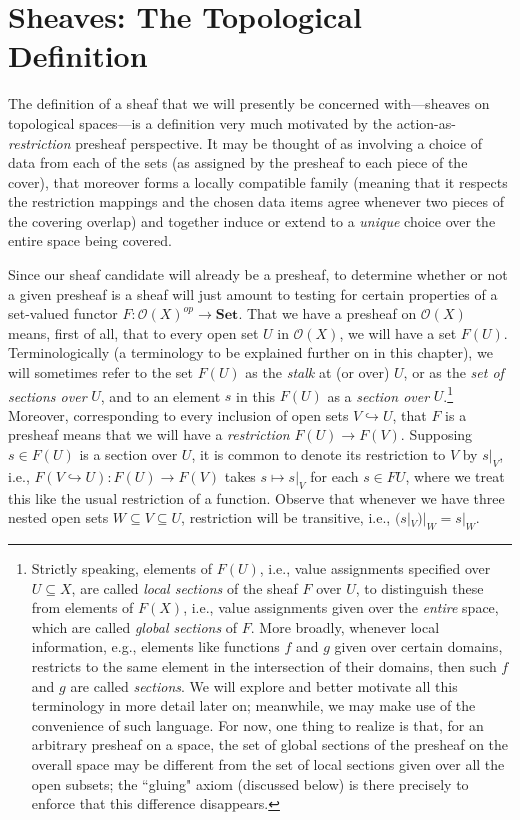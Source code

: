 \documentclass[11pt]{book}
\theoremstyle{definition}
\theoremstyle{definition}
\theoremstyle{definition}
\theoremstyle{theorem}
\theoremstyle{definition}
\begin{document}
		\section{Sheaves: The Topological Definition} 
		The definition of a sheaf that we will presently be concerned with---sheaves on topological spaces---is a definition very much motivated by the action-as-\textit{restriction} presheaf perspective. It may be thought of as involving a choice of data from each of the sets (as assigned by the presheaf to each piece of the cover), that moreover forms a locally compatible family (meaning that it respects the restriction mappings and the chosen data items agree whenever two pieces of the covering overlap) and together induce or extend to a \textit{unique} choice over the entire space being covered. \par 
		Since our sheaf candidate will already be a presheaf, to determine whether or not a given presheaf is a sheaf will just amount to testing for certain properties of a set-valued functor $F: \mathscr{O}(X)^{op} \rightarrow \textbf{Set}$. That we have a presheaf on $\mathscr{O}(X)$ means, first of all, that to every open set $U$ in $\mathscr{O}(X)$, we will have a set $F(U)$. Terminologically (a terminology to be explained further on in this chapter), we will sometimes refer to the set $F(U)$ as the \textit{stalk} at (or over) $U$, or as the \textit{set of sections over} $U$, and to an element $s$ in this $F(U)$ as a \textit{section over} $U$.\footnote{Strictly speaking, elements of $F(U)$, i.e., value assignments specified over $U \subseteq X$, are called \textit{local sections} of the sheaf $F$ over $U$, to distinguish these from elements of $F(X)$, i.e., value assignments given over the \textit{entire} space, which are called \textit{global sections} of $F$. More broadly, whenever local information, e.g., elements like functions $f$ and $g$ given over certain domains, restricts to the same element in the intersection of their domains, then such $f$ and $g$ are called \textit{sections}. We will explore and better motivate all this terminology in more detail later on; meanwhile, we may make use of the convenience of such language. For now, one thing to realize is that, for an arbitrary presheaf on a space, the set of global sections of the presheaf on the overall space may be different from the set of local sections given over all the open subsets; the ``gluing" axiom (discussed below) is there precisely to enforce that this difference disappears.} Moreover, corresponding to every inclusion of open sets $V \hookrightarrow U$, that $F$ is a presheaf means that we will have a \textit{restriction} $F(U) \rightarrow F(V)$. Supposing $s \in F(U)$ is a section over $U$, it is common to denote its restriction to $V$ by $s|_V$, i.e., $F(V \hookrightarrow U): F(U) \rightarrow F(V)$  takes $s \mapsto s|_V$ for each $s \in FU$, where we treat this like the usual restriction of a function. Observe that whenever we have three nested open sets $W \subseteq V \subseteq U$, restriction will be transitive, i.e., $(s|_V) |_W = s|_W$. \par 
\end{document}

